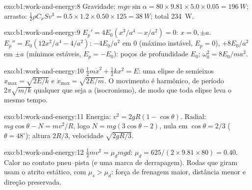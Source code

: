 \begin{solution}{exo:b1:work-and-energy:8}
Gravidade: $mgv\sin\alpha = 80 \times 9.81 \times 5.0 \times 0.05 = \qty{196}{W}$;
arrasto: $\tfrac12\rho C_xSv^3 = 0.5 \times 1.2 \times 0.50 \times 125 =
\qty{38}{W}$; total \qty{234}{W}.
\end{solution}

\begin{solution}{exo:b1:work-and-energy:9}
$E_p' = 4E_0(x^3/a^4 - x/a^2) = 0$: $x = 0, \pm a$. $E_p'' = E_0(12x^2/a^4 -
4/a^2)$: $-4E_0/a^2$ em $0$ (máximo instável, $E_p = 0$), $+8E_0/a^2$
em $\pm a$ (mínimos estáveis, $E_p = -E_0$): poços de profundidade $E_0$;
$\omega_0^2 = 8E_0/ma^2$.
\end{solution}

\begin{solution}{exo:b1:work-and-energy:10}
$\tfrac12 m\dot x^2 + \tfrac12 kx^2 = E$: uma elipse de semieixos $x_{\max}
= \sqrt{2E/k}$ e $\dot x_{\max} = \sqrt{2E/m}$. O movimento é harmônico,
de período $2\pi\sqrt{m/k}$ qualquer que seja a  (isocronismo), de modo que
toda elipse leva o mesmo tempo.
\end{solution}

\begin{solution}{exo:b1:work-and-energy:11}
Energia: $v^2 = 2gR(1 - \cos\theta)$. Radial: $mg\cos\theta - N = mv^2/R$,
logo $N = mg(3\cos\theta - 2)$, nula em $\cos\theta = 2/3$ ($\theta =
48^\circ$): altura $2R/3$, velocidade $\sqrt{2gR/3}$.
\end{solution}

\begin{solution}{exo:b1:work-and-energy:12}
$\tfrac12 mv^2 = \mu_dmgd$: $\mu_d = 625/(2 \times 9.81 \times 80) = 0.40$.
Calor no contato pneu--pista (e uma marca de derrapagem). Rodas que giram usam
o atrito estático, com $\mu_s > \mu_d$: força de frenagem maior, distância
menor e direção preservada.
\end{solution}

